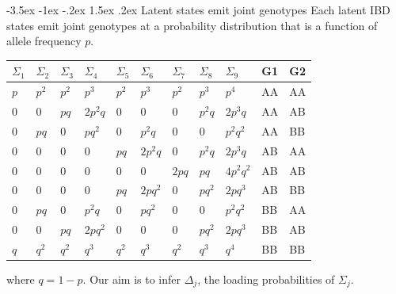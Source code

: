 \documentclass[portrait]{a0poster}
\makeatletter
\renewcommand\subsection{\@startsection {subsection}{2}{\z@}%
                                   {-3.5ex \@plus -1ex \@minus -.2ex}%
                                   {1.5ex \@plus.2ex}%
                                   {\large\bfseries\sc\color{mygreen}}}
\makeatother
\begin{document}
\begin{multicols}{3}
\subsection{Latent states emit joint genotypes}
Each latent IBD states emit joint genotypes at a probability distribution that is a function of allele frequency $p.$%
\begin{center} 
\begin{tabular}{lllllllll|ll}
 $\Sigma_1$ &  $\Sigma_2$ &  $\Sigma_3$ &  $\Sigma_4$ &  $\Sigma_5$ &  $\Sigma_6$ &  $\Sigma_7$ &  $\Sigma_8$ &  $\Sigma_9$ &G1 & G2 \\
\hline 
 $p$ & $p^2$ & $p^2$ & $p^3$ & $p^2$ & $p^3$ & $p^2$ & $p^3$ & $p^4$ & AA &AA \\       
 $0$ & $0$ & $pq$ & $2p^2q$ & $0$ & $0$ & $0$ & $p^2q$ &$2p^3q$ &AA &AB  \\
 $0$ & $pq$ & $0$ & $pq^2$ & $0$ & $p^2q$ & $0$ & $0$ &$p^2q^2$ &AA &BB \\
 $0$ & $0$ & $0$ & $0$ & $pq$ & $2p^2q$ & $0$ & $p^2q$ &$2p^3q$ & AB &AA   \\
$0$ & $0$ & $0$ & $0$ & $0$ & $0$ & $2pq$ & $pq$ &$4p^2q^2$ & AB &AB   \\
 $0$ & $0$ & $0$ & $0$ & $pq$ & $2pq^2$ & $0$ & $pq^2$ &$2pq^3$ & AB &BB \\
$0$ & $pq$ & $0$ & $p^2q$ & $0$ & $pq^2$ & $0$ & $0$ &$p^2q^2$ & BB &AA   \\
 $0$ & $0$ & $pq$ & $2pq^2$ & $0$ & $0$ & $0$ & $pq^2$ &$2pq^3$ &BB &AB   \\
 $q$ & $q^2$ & $q^2$ & $q^3$ & $q^2$ & $q^3$ & $q^2$ & $q^3$ & $q^4$ &BB &BB \\       
  \end{tabular} 
  \end{center}
  where $q = 1-p.$ Our aim is to infer $\Delta_j$, the loading probabilities of $\Sigma_j$. 

\vspace{-0.2in}

\end{multicols}
\end{document}
